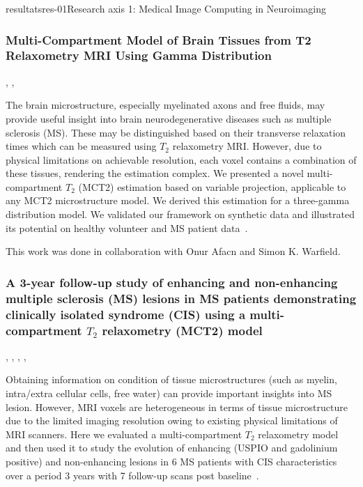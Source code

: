 \documentclass{ra2018}
\begin{document}
\begin{module}{resultats}{res-01}{Research axis 1: Medical Image Computing in Neuroimaging}
\subsubsection{Multi-Compartment Model of Brain Tissues from T2 Relaxometry MRI Using Gamma Distribution}
\begin{participants}
      , 
      ,
\end{participants}
The brain microstructure, especially myelinated axons and free fluids, may provide useful insight into brain neurodegenerative diseases such as multiple sclerosis (MS). These may be distinguished based on their transverse relaxation times which can be measured using $T_2$ relaxometry MRI. However, due to physical limitations on achievable resolution, each voxel contains a combination of these tissues, rendering the estimation complex. We presented a novel multi-compartment $T_2$ (MCT2) estimation based on variable projection, applicable to any MCT2 microstructure model. We derived this estimation for a three-gamma distribution model. We validated our framework on synthetic data and illustrated its potential on healthy volunteer and MS patient data~\cite{chatterjee:hal-01744852}.

This work was done in collaboration with Onur Afacn and Simon K. Warfield.

\subsubsection{A 3-year follow-up study of enhancing and non-enhancing multiple sclerosis (MS) lesions in MS patients demonstrating clinically isolated syndrome (CIS) using a multi-compartment $T_2$ relaxometry (MCT2) model}
\begin{participants}
      , 
      ,
      ,
      ,
\end{participants}
Obtaining information on condition of tissue microstructures (such as myelin, intra/extra cellular cells, free water) can provide important insights into MS lesion. However, MRI voxels are heterogeneous in terms of tissue microstructure due to the limited imaging resolution owing to existing physical limitations of MRI scanners. Here we evaluated a multi-compartment $T_2$ relaxometry model and then used it to study the evolution of enhancing (USPIO and gadolinium positive) and non-enhancing lesions in 6 MS patients with CIS characteristics over a period 3 years with 7 follow-up scans post baseline~\cite{chatterjee:hal-01821694}.


\end{module}
\end{document}
